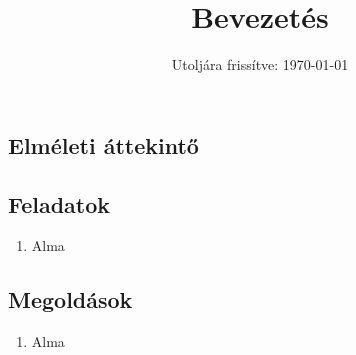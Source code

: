 \documentclass{szb-practice}
\title{Bevezetés}
\date{Utoljára frissítve: \today}
\begin{document}
\maketitle

\subsection{Elméleti áttekintő}

\clearpage
\subsection{Feladatok}

\begin{enumerate}
  \item Alma
\end{enumerate}

\clearpage
\subsection{Megoldások}
\begin{enumerate}
  \item Alma
\end{enumerate}
\end{document}
